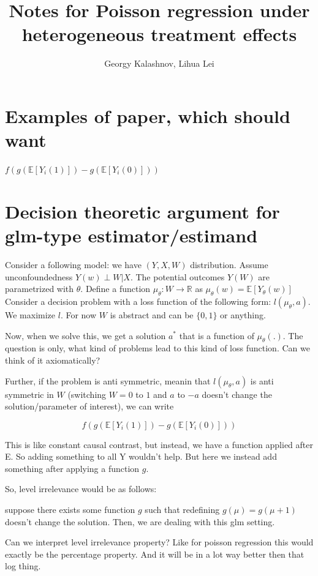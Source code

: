 \documentclass[a4paper,12pt]{article}
\date{}
\title{Notes for Poisson regression under heterogeneous treatment effects}
\author{Georgy Kalashnov, Lihua Lei}
\theoremstyle{plain}
\theoremstyle{plain}
\begin{document}
\maketitle

\section{Examples of paper, which should want}

$f(g(\mathbb{E}[Y_i(1)]) - g(\mathbb{E}[Y_i(0)]))$



\section{Decision theoretic argument for glm-type estimator/estimand}


Consider a following model: we have $(Y, X, W)$ distribution. Assume unconfoundedness $Y(w) \perp W | X$. The potential outcomes $Y(W)$ are parametrized with $\theta$. Define a function $\mu_\theta: W \to \mathbb{R}$ as $\mu_\theta(w) = \mathbb{E}[Y_\theta(w)]$  Consider a decision problem with a loss function of the following form: $l(\mu_\theta, a)$. We maximize $l$. For now $W$ is abstract and can be $\{0, 1\}$ or anything.

Now, when we solve this, we get a solution $a^\ast$ that is a function of $\mu_\theta(.)$.  The question is only, what kind of problems lead to this kind of loss function. Can we think of it axiomatically?

Further, if the problem is anti symmetric, meanin that $l(\mu_\theta, a)$ is anti symmetric in $W$ (switching $W=0$ to $1$ and $a$ to $-a$ doesn't change the solution/parameter of interest), we can write

\[f(g(\mathbb{E}[Y_i(1)]) - g(\mathbb{E}[Y_i(0)]))\]

This is like constant causal contrast, but instead, we have a function applied after E. So adding something to all Y wouldn't help. But here we instead add something after applying a function $g$. 

So, level irrelevance would be as follows:

suppose there exists some function $g$ such that redefining $g(\mu) = g(\mu + 1)$ doesn't change the solution. Then, we are dealing with this glm setting.

Can we interpret level irrelevance property? Like for poisson regression this would exactly be the percentage property. And it will be in a lot way better then that log thing.
\end{document}
